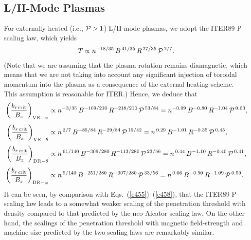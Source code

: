 \documentclass[12pt,prb,aps]{revtex4-1}
\begin{document}
\subsection{L/H-Mode Plasmas}
For externally heated (i.e., ${\cal P}>1$) L/H-mode plasmas, we adopt the ITER89-P scaling law,\cite{yush}
which yields
\begin{equation}
T\propto n^{-18/35}\,B^{\,41/35}\,R^{\,27/35}\,{\cal P}^{\,2/7}.
\end{equation}
(Note that we are assuming that the plasma rotation remains diamagnetic, which means that we are not taking into
account any significant injection of toroidal momentum into the plasma as a consequence of the external
heating scheme. This assumption is reasonable for ITER.)
Hence, we deduce that 
\begin{align}\label{e141}
\left(\frac{b_{r\,{\rm crit}}}{B_z}\right)_{{\rm VR}-\varphi} &\propto n^{-3/35}\,B^{-169/210}\,R^{-218/210}\,{\cal P}^{\,53/84}= n^{-0.09}\,B^{-0.80}\,R^{-1.04}\,{\cal P}^{\,0.63},\\[0.5ex]
\left(\frac{b_{r\,{\rm crit}}}{B_z}\right)_{{\rm VR}-\theta} &\propto n^{\,2/7}\,B^{-85/84}\,R^{-29/84}\,{\cal P}^{\,19/42}= n^{\,0.29}\,B^{-1.01}
\,R^{-0.35}\,{\cal P}^{\,0.45},\\[0.5ex]
\left(\frac{b_{r\,{\rm crit}}}{B_z}\right)_{{\rm DR}-\theta} &\propto n^{\,61/140}\,B^{-309/280}\,R^{-113/280}\,{\cal P}^{\,23/56}=n^{\,0.44}\,B^{-1.10}\,R^{-0.40}\,{\cal P}^{\,0.41},\\[0.5ex]
\left(\frac{b_{r\,{\rm crit}}}{B_z}\right)_{{\rm DR}-\varphi} &\propto n^{\,9/140}\,B^{-251/280}\,R^{-307/280}\,{\cal P}^{\,33/56}= n^{\,0.06}\,B^{-0.90}\,R^{-1.09}\,{\cal P}^{\,0.59}.\label{e144}
\end{align}
It can be seen, by comparison with Eqs.~(\ref{e455})--(\ref{e458}), that the ITER89-P scaling law leads to a
somewhat weaker scaling of the penetration threshold with density compared to that predicted by the neo-Alcator scaling law. On the other hand, the scalings of the
penetration threshold with magnetic field-strength and machine size predicted by the two scaling laws are
remarkably similar. 
\end{document}
